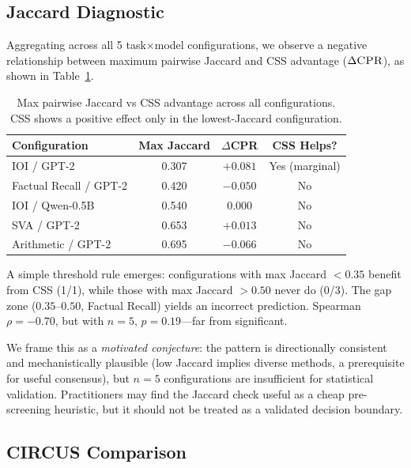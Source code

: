 \documentclass[11pt,a4paper]{article}
\newcommand{\css}{\textsc{CSS}}
\newcommand{\cpr}{\textsc{CPR}}
\begin{document}
\subsection{Jaccard Diagnostic}
\label{sec:diagnostic}

Aggregating across all 5 task$\times$model configurations, we observe a negative relationship between maximum pairwise Jaccard and \css{} advantage ($\Delta\cpr{}$), as shown in Table~\ref{tab:jaccard-scatter}.

\begin{table}[t]
\centering
\small
\begin{tabular}{lccc}
\toprule
\textbf{Configuration} & \textbf{Max Jaccard} & \textbf{$\Delta$\cpr{}} & \textbf{CSS Helps?} \\
\midrule
IOI / GPT-2 & 0.307 & $+0.081$ & Yes (marginal) \\
Factual Recall / GPT-2 & 0.420 & $-0.050$ & No \\
IOI / Qwen-0.5B & 0.540 & $0.000$ & No \\
SVA / GPT-2 & 0.653 & $+0.013$ & No \\
Arithmetic / GPT-2 & 0.695 & $-0.066$ & No \\
\bottomrule
\end{tabular}
\caption{Max pairwise Jaccard vs \css{} advantage across all configurations. \css{} shows a positive effect only in the lowest-Jaccard configuration.}
\label{tab:jaccard-scatter}
\end{table}

A simple threshold rule emerges: configurations with max Jaccard $< 0.35$ benefit from \css{} (1/1), while those with max Jaccard $> 0.50$ never do (0/3). The gap zone ($0.35$--$0.50$, Factual Recall) yields an incorrect prediction. Spearman $\rho = -0.70$, but with $n=5$, $p=0.19$---far from significant.

We frame this as a \emph{motivated conjecture}: the pattern is directionally consistent and mechanistically plausible (low Jaccard implies diverse methods, a prerequisite for useful consensus), but $n=5$ configurations are insufficient for statistical validation. Practitioners may find the Jaccard check useful as a cheap pre-screening heuristic, but it should not be treated as a validated decision boundary.

\subsection{CIRCUS Comparison}
\label{sec:circus}
\end{document}

